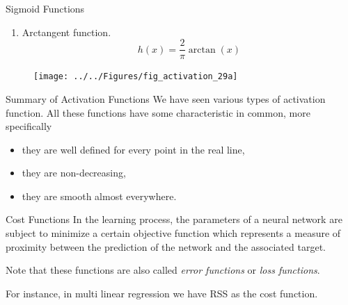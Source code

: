 \documentclass{beamer}
\begin{document}
\begin{frame}{Sigmoid Functions}
	\begin{enumerate}
		\item Arctangent function.  
		\begin{equation*}
			h(x)=\frac{2}{\pi}\arctan(x)
		\end{equation*}
	\end{enumerate}

	\begin{figure}[h]
	\centering
	\texttt{[image: ../../Figures/fig\_activation\_29a]}
\end{figure}
\end{frame}

\begin{frame}{Summary of Activation Functions}
	We have seen various types of activation function. All these functions have some characteristic in common, more specifically 
	
	\begin{itemize}
		\item they are well defined for every point in the real line,
		\item they are non-decreasing, 
		\item they are smooth almost everywhere.
	\end{itemize}
\end{frame}

\begin{frame}{Cost Functions}
	In the learning process, the parameters of a neural network are subject to minimize a certain objective function which represents a measure of proximity between the prediction of the network and the associated target.
	
	Note that these functions are also called \textit{error functions} or \textit{loss functions}. 
	
	For instance, in multi linear regression we have RSS as the cost function.
\end{frame}
\end{document}
